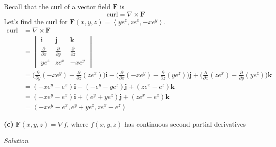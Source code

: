 \documentclass{article}
\newcommand{\lrp}[1]{\left( #1 \right)}
\newcommand{\lra}[1]{\left\langle #1 \right\rangle}
\renewcommand{\i}[0]{\mathbf{i}}
\renewcommand{\j}[0]{\mathbf{j}}
\renewcommand{\k}[0]{\mathbf{k}}
\newcommand{\F}[0]{\mathbf{F}}
\newcommand{\Solution}{\textit{Solution}}
\begin{document}
Recall that the curl of a vector field $\F$ is
\begin{equation*}
    \text{curl}=\nabla \times \F
\end{equation*}
Let's find the curl for $\F(x,y,z)=\lra{ye^z,ze^x,-xe^y}$.
\begin{align*}
     \text{curl}&=\nabla \times \F\\ &=\begin{vmatrix}
    \i & \j & \k \\
    \frac{\partial }{\partial x} &  \frac{\partial }{\partial y} &
     \frac{\partial }{\partial z}\\
     ye^z & ze^x& -xe^y
    \end{vmatrix}\\
    &=\Bigg(\frac{\partial }{\partial y}(-xe^y)-\frac{\partial }{\partial z}(ze^x)\Bigg)\i-\Bigg(\frac{\partial}{\partial x}(-xe^y)-\frac{\partial}{\partial z}(ye^z)\Bigg)\j+\Bigg(\frac{\partial}{\partial x}(ze^x)-\frac{\partial}{\partial y}(ye^z)\Bigg)\k\\
    &=\lrp{-xe^y-e^x}\i-\lrp{-e^y-ye^z}\j+\lrp{ze^x-e^z}\k\\
    &=\lrp{-xe^y-e^x}\i+\lrp{e^y+ye^z}\j+\lrp{ze^x-e^z}\k\\
    &=\boxed{\lra{-xe^y-e^x,e^y+ye^z,ze^x-e^z}}
\end{align*}

{}\textbf{(c)} $\F(x,y,z)=\nabla f$, where $f(x,y,z)$ has continuous second partial derivatives

\Solution
\end{document}
